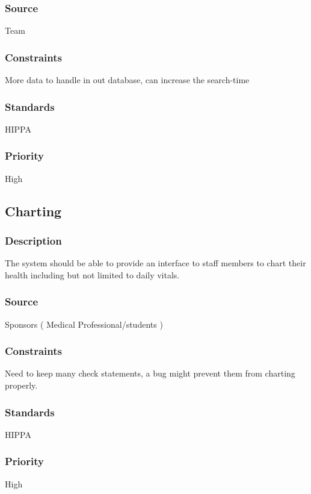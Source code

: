 \subsubsection{Source}
Team
\subsubsection{Constraints}
More data to handle in out database, can increase the search-time
\subsubsection{Standards}
HIPPA
\subsubsection{Priority}
High 

\subsection{Charting}
\subsubsection{Description}
The system should be able to provide an interface to staff members to chart their health including but not limited to daily vitals.
\subsubsection{Source}
Sponsors ( Medical Professional/students )

\subsubsection{Constraints}
Need to keep many check statements, a bug might prevent them from charting properly.
\subsubsection{Standards}
HIPPA
\subsubsection{Priority}
High 

